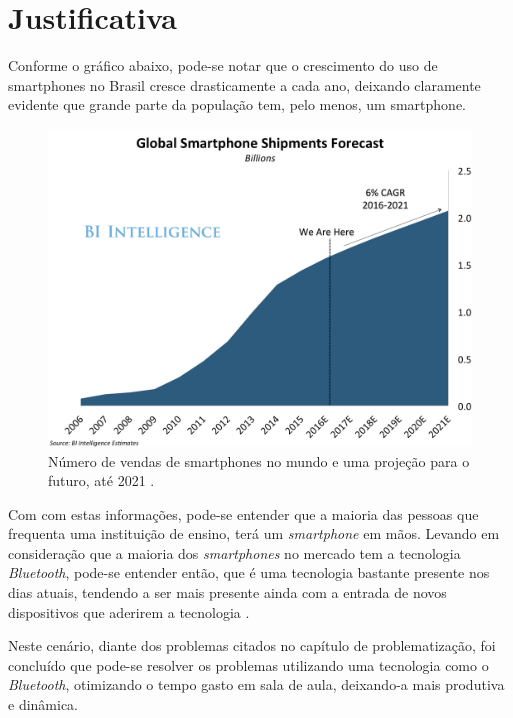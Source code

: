 \documentclass[
	12pt,
	oneside,
	a4paper,
	english,
	brazil,
]{abntex2}
\begin{document}

\chapter{Justificativa}

Conforme o gráfico abaixo, pode-se notar que o crescimento do uso de smartphones no Brasil cresce drasticamente a cada ano, deixando claramente evidente que grande parte da população tem, pelo menos, um smartphone.

\begin{figure}[h]
\centering
\includegraphics[width=1.0\textwidth]{smartphone_sales}
    \caption{
        Número de vendas de smartphones no mundo e uma projeção para o futuro, até 2021 \cite{smartphone-numbers-image}.
    }
\end{figure}

Com com estas informações, pode-se entender que a maioria das pessoas que frequenta uma instituição de ensino, terá um \emph{smartphone} em mãos. Levando em consideração que a maioria dos \emph{smartphones} no mercado tem a tecnologia \emph{Bluetooth}, pode-se entender então, que é uma tecnologia bastante presente nos dias atuais, tendendo a ser mais presente ainda com a entrada de novos dispositivos que aderirem a tecnologia \cite{bluetooth-devices}.

Neste cenário, diante dos problemas citados no capítulo de problematização, foi concluído que pode-se resolver os problemas utilizando uma tecnologia como o \emph{Bluetooth}, otimizando o tempo gasto em sala de aula, deixando-a mais produtiva e dinâmica.
\end{document}
